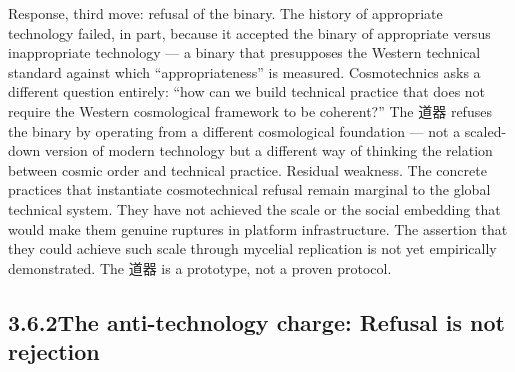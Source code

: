 Response, third move: refusal of the binary. The history of appropriate technology failed, in part, because it accepted the binary of appropriate versus inappropriate technology — a binary that presupposes the Western technical standard against which “appropriateness” is measured. Cosmotechnics asks a different question entirely: “how can we build technical practice that does not require the Western cosmological framework to be coherent?” The 道器 refuses the binary by operating from a different cosmological foundation — not a scaled-down version of modern technology but a different way of thinking the relation between cosmic order and technical practice. Residual weakness. The concrete practices that instantiate cosmotechnical refusal remain marginal to the global technical system. They have not achieved the scale or the social embedding that would make them genuine ruptures in platform infrastructure. The assertion that they could achieve such scale through mycelial replication is not yet empirically demonstrated. The 道器 is a prototype, not a proven protocol.

\subsection{3.6.2\quad The anti-technology charge: Refusal is not rejection}

